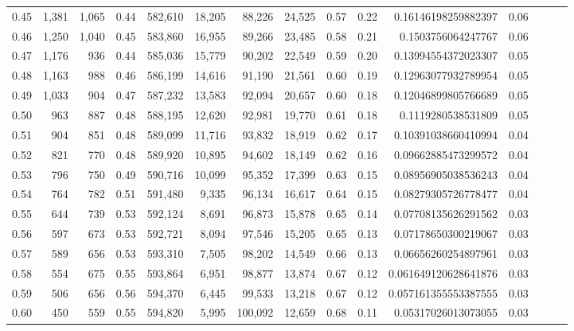 \begin{tabular}{rrrrrrrrrrrrrrr}
0.45 &   1,381 &  1,065 &  0.44 &  582,610 &   18,205 &   88,226 &   24,525 &  0.57 &  0.22 &     0.16146198259882397 &      0.06 \\
0.46 &   1,250 &  1,040 &  0.45 &  583,860 &   16,955 &   89,266 &   23,485 &  0.58 &  0.21 &      0.1503756064247767 &      0.06 \\
0.47 &   1,176 &    936 &  0.44 &  585,036 &   15,779 &   90,202 &   22,549 &  0.59 &  0.20 &     0.13994554372023307 &      0.05 \\
0.48 &   1,163 &    988 &  0.46 &  586,199 &   14,616 &   91,190 &   21,561 &  0.60 &  0.19 &     0.12963077932789954 &      0.05 \\
0.49 &   1,033 &    904 &  0.47 &  587,232 &   13,583 &   92,094 &   20,657 &  0.60 &  0.18 &     0.12046899805766689 &      0.05 \\
0.50 &     963 &    887 &  0.48 &  588,195 &   12,620 &   92,981 &   19,770 &  0.61 &  0.18 &      0.1119280538531809 &      0.05 \\
0.51 &     904 &    851 &  0.48 &  589,099 &   11,716 &   93,832 &   18,919 &  0.62 &  0.17 &     0.10391038660410994 &      0.04 \\
0.52 &     821 &    770 &  0.48 &  589,920 &   10,895 &   94,602 &   18,149 &  0.62 &  0.16 &     0.09662885473299572 &      0.04 \\
0.53 &     796 &    750 &  0.49 &  590,716 &   10,099 &   95,352 &   17,399 &  0.63 &  0.15 &     0.08956905038536243 &      0.04 \\
0.54 &     764 &    782 &  0.51 &  591,480 &    9,335 &   96,134 &   16,617 &  0.64 &  0.15 &     0.08279305726778477 &      0.04 \\
0.55 &     644 &    739 &  0.53 &  592,124 &    8,691 &   96,873 &   15,878 &  0.65 &  0.14 &     0.07708135626291562 &      0.03 \\
0.56 &     597 &    673 &  0.53 &  592,721 &    8,094 &   97,546 &   15,205 &  0.65 &  0.13 &     0.07178650300219067 &      0.03 \\
0.57 &     589 &    656 &  0.53 &  593,310 &    7,505 &   98,202 &   14,549 &  0.66 &  0.13 &     0.06656260254897961 &      0.03 \\
0.58 &     554 &    675 &  0.55 &  593,864 &    6,951 &   98,877 &   13,874 &  0.67 &  0.12 &    0.061649120628641876 &      0.03 \\
0.59 &     506 &    656 &  0.56 &  594,370 &    6,445 &   99,533 &   13,218 &  0.67 &  0.12 &    0.057161355553387555 &      0.03 \\
0.60 &     450 &    559 &  0.55 &  594,820 &    5,995 &  100,092 &   12,659 &  0.68 &  0.11 &     0.05317026013073055 &      0.03 \\

\end{tabular}
